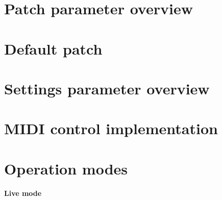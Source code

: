 \documentclass[landscape, 11pt, oneside]{report}
\newenvironment{flowtext}{\addmargin[0cm]{7cm}}{\endaddmargin} %
\begin{document}
\begin{flowtext}

\section{Patch parameter overview}\label{patchref}



\section{Default patch}\label{default}



\section{Settings parameter overview}\label{settingsref}



\section{MIDI control implementation}\label{midiimplementation}



\end{flowtext}

\pagebreak

\section{Operation modes}\label{modes}

\textbf{Live mode}
\end{document}
